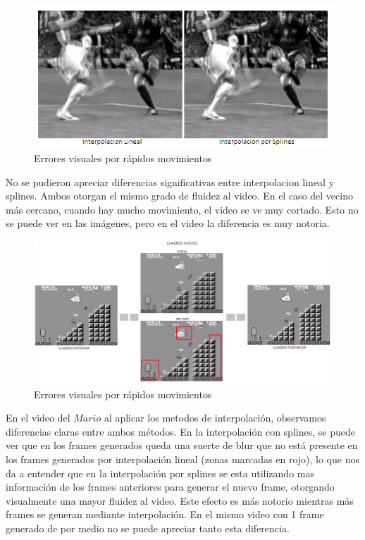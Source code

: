 \newpage

\begin{figure}[h!]
  \centering
    \includegraphics[scale= 0.5]{imagenes/messi.png}
  \caption{Errores visuales por rápidos movimientos}
\end{figure}


No se pudieron apreciar diferencias significativas entre interpolacion lineal y splines. Ambos otorgan el mismo grado de fluidez al video. En el caso del vecino más cercano, cuando hay mucho movimiento, el video se ve muy cortado. Esto no se puede ver en las imágenes, pero en el video la diferencia es muy notoria.


\begin{figure}[h!]
  \centering
    \includegraphics[scale= 0.587]{imagenes/mario.png}
  \caption{Errores visuales por rápidos movimientos}
\end{figure}


En el video del $Mario$ al aplicar los metodos de interpolación, observamos diferencias claras entre ambos métodos. En la interpolación con splines, se puede ver que en los frames generados queda una suerte de blur que no está presente en los frames generados por interpolación lineal (zonas marcadas en rojo), lo que nos da a entender que en la interpolación por splines se esta utilizando mas información de los frames anteriores para generar el nuevo frame, otorgando visualmente una mayor fluidez al video.
Este efecto es más notorio mientras más frames se generan mediante interpolación. En el mismo video con 1 frame generado de por medio no se puede apreciar tanto esta diferencia.\\

